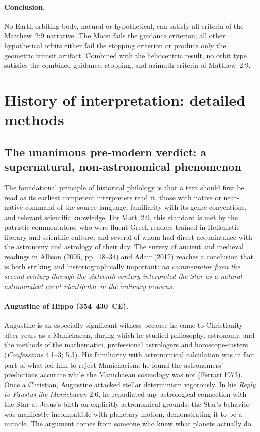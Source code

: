 \documentclass[11pt,a4paper]{article}
\begin{document}
\paragraph{Conclusion.}
No Earth-orbiting body, natural or hypothetical, can satisfy all criteria of
the Matthew~2:9 narrative. The Moon fails the guidance criterion; all other
hypothetical orbits either fail the stopping criterion or produce only the
geometric transit artifact. Combined with the heliocentric result, no orbit type satisfies the combined guidance, stopping, and azimuth criteria of Matthew~2:9.

\section{History of interpretation: detailed methods}

\subsection{The unanimous pre-modern verdict: a supernatural, non-astronomical phenomenon}

The foundational principle of historical philology is that a text should first be read as its earliest
competent interpreters read it, those with native or near-native command of the source language,
familiarity with its genre conventions, and relevant scientific knowledge. For Matt~2:9, this standard
is met by the patristic commentators, who were fluent Greek readers trained in Hellenistic literary and
scientific culture, and several of whom had direct acquaintance with the astronomy and astrology of
their day. The survey of ancient and medieval readings in Allison (2005, pp.~18--34)\cite{allison2005}
and Adair (2012)\cite{adair2012} reaches a conclusion that is both striking and historiographically
important: \emph{no commentator from the second century through the sixteenth century interpreted
the Star as a natural astronomical event identifiable in the ordinary heavens.}

\paragraph{Augustine of Hippo (354--430~CE).}
Augustine is an especially significant witness because he came to Christianity after years as
a Manichaean, during which he studied philosophy, astronomy, and the methods of the
mathematici, professional astrologers and horoscope-casters (\textit{Confessions} 4.1--3; 5.3).
His familiarity with astronomical calculation was in fact part of what led him to reject
Manichaeism: he found the astronomers' predictions accurate while the Manichaean cosmology
was not (Ferrari 1973). Once a Christian, Augustine attacked stellar determinism vigorously.
In his \textit{Reply to Faustus the Manichaean} 2.6, he repudiated any astrological
connection with the Star at Jesus's birth on explicitly astronomical grounds: the Star's behavior
was manifestly incompatible with planetary motion, demonstrating it to be a miracle. The
argument comes from someone who knew what planets actually do.
\end{document}
